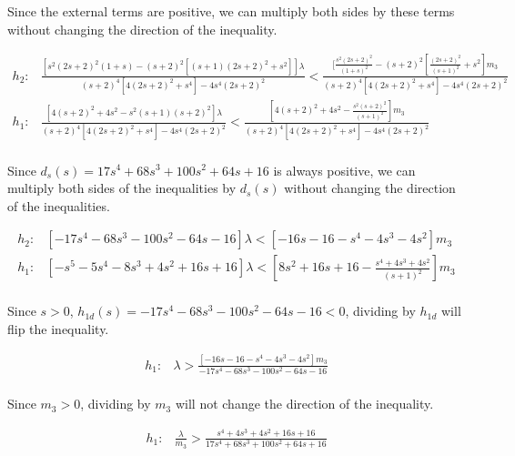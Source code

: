 \documentclass[11pt,leqno]{article}
\theoremstyle{definition}
\theoremstyle{remark}
\numberwithin{equation}{section}
\begin{document}
Since the external terms are positive, we can multiply both sides by these terms without changing the direction of the inequality.

\begin{equation}
\begin{array}{ll}
h_{2}: & \frac{[s^{2}(2s+2)^{2}(1+s)-(s+2)^{2}[(s+1)(2s+2)^{2}+s^{2}]]\lambda}{(s+2)^{4}[4(2s+2)^{2}+s^{4}]-4s^{4}(2s+2)^{2}}<\frac{[\frac{s^{2}(2s+2)^{2}}{(1+s)^{2}}-(s+2)^{2}[\frac{(2s+2)^{2}}{(s+1)^{2}}+s^{2}]m_{3}}{(s+2)^{4}[4(2s+2)^{2}+s^{4}]-4s^{4}(2s+2)^{2}}\\

h_{1}: & \frac{[4(s+2)^{2}+4s^{2}-s^{2}(s+1)(s+2)^{2}]\lambda}{(s+2)^{4}[4(2s+2)^{2}+s^{4}]-4s^{4}(2s+2)^{2}}<\frac{[4(s+2)^{2}+4s^{2}-\frac{s^{2}(s+2)^{2}}{(s+1)^{2}}]m_{3}}{(s+2)^{4}[4(2s+2)^{2}+s^{4}]-4s^{4}(2s+2)^{2}} \\
\end{array}
\end{equation}

Since $d_s(s) = 17s^{4}+68s^{3}+100s^{2}+64s+16$ is always positive, we can multiply both sides of the inequalities by $d_s(s)$ without
changing the direction of the inequalities.

\begin{equation} \begin{array}{ll}
h_{2}: & [-17s^{4}-68s^{3}-100s^{2}-64s-16]\lambda<[-16s-16-s^{4}-4s^{3}-4s^{2}]m_{3} \\
h_{1}: & [-s^{5}-5s^{4}-8s^{3}+4s^{2}+16s+16]\lambda<[8s^{2}+16s+16-\frac{s^{4}+4s^{3}+4s^{2}}{(s+1)^{2}}]m_{3} \\
\end{array}
\end{equation}

Since $s>0$, $h_{1d}(s)=-17s^{4}-68s^{3}-100s^{2}-64s-16<0$, dividing by $h_{1d}$ will flip the inequality.


\begin{equation}
\begin{array}{ll}
h_{1}: & \lambda>\frac{[-16s-16-s^{4}-4s^{3}-4s^{2}]m_{3}}{-17s^{4}-68s^{3}-100s^{2}-64s-16}\\
\end{array}
\end{equation}

Since $m_{3}>0$, dividing by $m_{3}$ will not change the direction of the inequality.


\begin{equation}
\begin{array}{ll}

h_{1}: & \frac{\lambda}{m_{3}}>\frac{s^{4}+4s^{3}+4s^{2}+16s+16}{17s^{4}+68s^{3}+100s^{2}+64s+16}\\
\end{array}
\end{equation}
\end{document}

